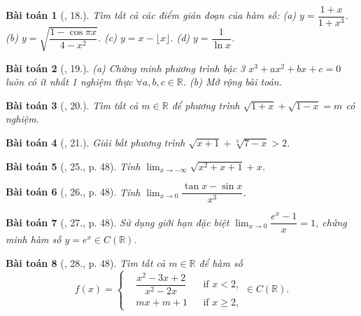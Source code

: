 \documentclass[oneside]{book}
\newtheorem{baitoan}{Bài toán}
\begin{document}
\begin{baitoan}[\cite{TLCT_dai_so_giai_tich_11}, 18.]
	Tìm tất cả các điểm gián đoạn của hàm số: (a) $y = \dfrac{1 + x}{1 + x^3}$. (b) $y = \sqrt{\dfrac{1 - \cos\pi x}{4 - x^2}}$. (c) $y = x - \lfloor x\rfloor$. (d) $y = \dfrac{1}{\ln x}$.
\end{baitoan}

\begin{baitoan}[\cite{TLCT_dai_so_giai_tich_11}, 19.]
	(a) Chứng minh phương trình bậc 3 $x^3 + ax^2 + bx + c = 0$ luôn có ít nhất 1 nghiệm thực $\forall a,b,c\in\mathbb{R}$. (b) Mở rộng bài toán.
\end{baitoan}

\begin{baitoan}[\cite{TLCT_dai_so_giai_tich_11}, 20.]
	Tìm tất cả $m\in\mathbb{R}$ để phương trình $\sqrt{1 + x} + \sqrt{1 - x} = m$ có nghiệm.
\end{baitoan}

\begin{baitoan}[\cite{TLCT_dai_so_giai_tich_11}, 21.]
	Giải bất phương trình $\sqrt{x + 1} + \sqrt[3]{7 - x} > 2$.
\end{baitoan}

\begin{baitoan}[\cite{TLCT_BT_dai_so_giai_tich_11}, 25., p. 48]
	Tính $\lim_{x\to-\infty} \sqrt{x^2 + x + 1} + x$.
\end{baitoan}

\begin{baitoan}[\cite{TLCT_BT_dai_so_giai_tich_11}, 26., p. 48]
	Tính $\lim_{x\to0} \dfrac{\tan x - \sin x}{x^3}$.
\end{baitoan}

\begin{baitoan}[\cite{TLCT_BT_dai_so_giai_tich_11}, 27., p. 48]
	Sử dụng giới hạn đặc biệt $\lim_{x\to0} \dfrac{e^x - 1}{x} = 1$, chứng minh hàm số $y = e^x\in C(\mathbb{R})$.
\end{baitoan}

\begin{baitoan}[\cite{TLCT_BT_dai_so_giai_tich_11}, 28., p. 48]
	Tìm tất cả $m\in\mathbb{R}$ để hàm số
	\begin{equation*}
		f(x) = \left\{\begin{split}
			&\dfrac{x^2 - 3x + 2}{x^2 - 2x}&&\mbox{if } x < 2,\\
			&mx + m + 1&&\mbox{if } x\ge2,
		\end{split}\right.\in C(\mathbb{R}).
	\end{equation*}
\end{baitoan}
\end{document}
